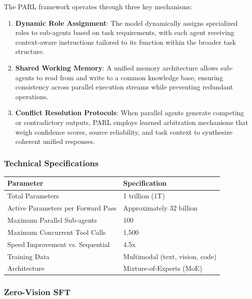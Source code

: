 The PARL framework operates through three key mechanisms:

\begin{enumerate}
    \item \textbf{Dynamic Role Assignment}: The model dynamically assigns specialized roles to sub-agents based on task requirements, with each agent receiving context-aware instructions tailored to its function within the broader task structure.

    \item \textbf{Shared Working Memory}: A unified memory architecture allows sub-agents to read from and write to a common knowledge base, ensuring consistency across parallel execution streams while preventing redundant operations.

    \item \textbf{Conflict Resolution Protocols}: When parallel agents generate competing or contradictory outputs, PARL employs learned arbitration mechanisms that weigh confidence scores, source reliability, and task context to synthesize coherent unified responses.

\end{enumerate}
\subsubsection{Technical Specifications}

\begin{table}[tbp]
\centering
\footnotesize
\begin{tabularx}{\textwidth}{YY}
\toprule
\textbf{Parameter} & \textbf{Specification} \\
\midrule
Total Parameters & 1 trillion (1T) \\
Active Parameters per Forward Pass & Approximately 32 billion \\
Maximum Parallel Sub-agents & 100 \\
Maximum Concurrent Tool Calls & 1,500 \\
Speed Improvement vs. Sequential & 4.5x \\
Training Data & Multimodal (text, vision, code) \\
Architecture & Mixture-of-Experts (MoE) \\
\bottomrule
\end{tabularx}
\end{table}

\subsubsection{Zero-Vision SFT}

